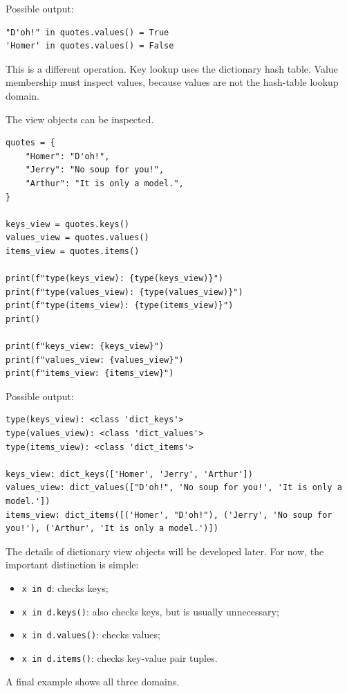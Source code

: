 Possible output:

\begin{verbatim}
"D'oh!" in quotes.values() = True
'Homer' in quotes.values() = False
\end{verbatim}

This is a different operation. Key lookup uses the dictionary hash table. Value membership must inspect values, because values are not the hash-table lookup domain.

The view objects can be inspected.

\begin{verbatim}
quotes = {
    "Homer": "D'oh!",
    "Jerry": "No soup for you!",
    "Arthur": "It is only a model.",
}

keys_view = quotes.keys()
values_view = quotes.values()
items_view = quotes.items()

print(f"type(keys_view): {type(keys_view)}")
print(f"type(values_view): {type(values_view)}")
print(f"type(items_view): {type(items_view)}")
print()

print(f"keys_view: {keys_view}")
print(f"values_view: {values_view}")
print(f"items_view: {items_view}")
\end{verbatim}

Possible output:

\begin{verbatim}
type(keys_view): <class 'dict_keys'>
type(values_view): <class 'dict_values'>
type(items_view): <class 'dict_items'>

keys_view: dict_keys(['Homer', 'Jerry', 'Arthur'])
values_view: dict_values(["D'oh!", 'No soup for you!', 'It is only a model.'])
items_view: dict_items([('Homer', "D'oh!"), ('Jerry', 'No soup for you!'), ('Arthur', 'It is only a model.')])
\end{verbatim}

The details of dictionary view objects will be developed later. For now, the important distinction is simple:

\begin{itemize}
    \item \texttt{x in d}: checks keys;
    \item \texttt{x in d.keys()}: also checks keys, but is usually unnecessary;
    \item \texttt{x in d.values()}: checks values;
    \item \texttt{x in d.items()}: checks key-value pair tuples.
\end{itemize}

A final example shows all three domains.

